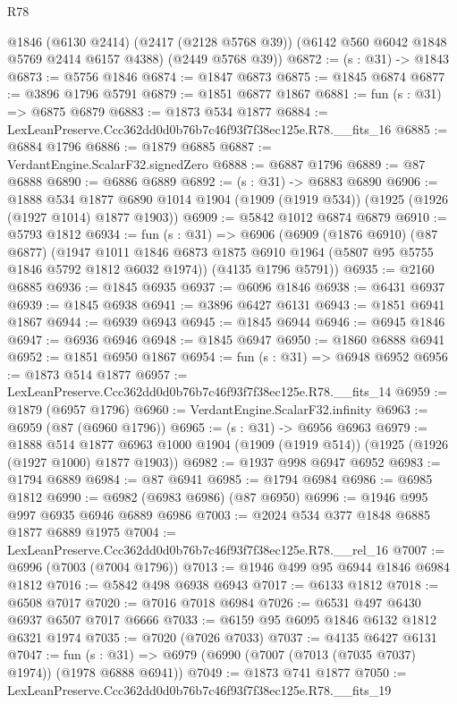 \begin{lexlean}{R78}
\begin{coremodule}
      @1846
      (@6130 @2414)
      (@2417 (@2128 @5768 @39))
      (@6142 @560 @6042 @1848 @5769 @2414 @6157 @4388)
      (@2449 @5768 @39))
@6872 := (s : @31) -> @1843
@6873 := @5756 @1846
@6874 := @1847 @6873
@6875 := @1845 @6874
@6877 := @3896 @1796 @5791
@6879 := @1851 @6877 @1867
@6881 := fun (s : @31) => @6875 @6879
@6883 := @1873 @534 @1877
@6884 := LexLeanPreserve.Ccc362dd0d0b76b7c46f93f7f38ec125e.R78.__fits_16
@6885 := @6884 @1796
@6886 := @1879 @6885
@6887 := VerdantEngine.ScalarF32.signedZero
@6888 := @6887 @1796
@6889 := @87 @6888
@6890 := @6886 @6889
@6892 := (s : @31) -> @6883 @6890
@6906 := @1888
    @534
    @1877
    @6890
    @1014
    @1904
    (@1909 (@1919 @534))
    (@1925 (@1926 (@1927 @1014) @1877 @1903))
@6909 := @5842 @1012 @6874 @6879
@6910 := @5793 @1812
@6934 := fun (s : @31) =>
  @6906
    (@6909
      (@1876 @6910)
      (@87 @6877)
      (@1947 @1011 @1846 @6873 @1875 @6910 @1964 (@5807 @95 @5755 @1846 @5792 @1812 @6032 @1974))
      (@4135 @1796 @5791))
@6935 := @2160 @6885
@6936 := @1845 @6935
@6937 := @6096 @1846
@6938 := @6431 @6937
@6939 := @1845 @6938
@6941 := @3896 @6427 @6131
@6943 := @1851 @6941 @1867
@6944 := @6939 @6943
@6945 := @1845 @6944
@6946 := @6945 @1846
@6947 := @6936 @6946
@6948 := @1845 @6947
@6950 := @1860 @6888 @6941
@6952 := @1851 @6950 @1867
@6954 := fun (s : @31) => @6948 @6952
@6956 := @1873 @514 @1877
@6957 := LexLeanPreserve.Ccc362dd0d0b76b7c46f93f7f38ec125e.R78.__fits_14
@6959 := @1879 (@6957 @1796)
@6960 := VerdantEngine.ScalarF32.infinity
@6963 := @6959 (@87 (@6960 @1796))
@6965 := (s : @31) -> @6956 @6963
@6979 := @1888
    @514
    @1877
    @6963
    @1000
    @1904
    (@1909 (@1919 @514))
    (@1925 (@1926 (@1927 @1000) @1877 @1903))
@6982 := @1937 @998 @6947 @6952
@6983 := @1794 @6889
@6984 := @87 @6941
@6985 := @1794 @6984
@6986 := @6985 @1812
@6990 := @6982 (@6983 @6986) (@87 @6950)
@6996 := @1946 @995 @997 @6935 @6946 @6889 @6986
@7003 := @2024 @534 @377 @1848 @6885 @1877 @6889 @1975
@7004 := LexLeanPreserve.Ccc362dd0d0b76b7c46f93f7f38ec125e.R78.__rel_16
@7007 := @6996 (@7003 (@7004 @1796))
@7013 := @1946 @499 @95 @6944 @1846 @6984 @1812
@7016 := @5842 @498 @6938 @6943
@7017 := @6133 @1812
@7018 := @6508 @7017
@7020 := @7016 @7018 @6984
@7026 := @6531 @497 @6430 @6937 @6507 @7017 @6666
@7033 := @6159 @95 @6095 @1846 @6132 @1812 @6321 @1974
@7035 := @7020 (@7026 @7033)
@7037 := @4135 @6427 @6131
@7047 := fun (s : @31) => @6979 (@6990 (@7007 (@7013 (@7035 @7037) @1974)) (@1978 @6888 @6941))
@7049 := @1873 @741 @1877
@7050 := LexLeanPreserve.Ccc362dd0d0b76b7c46f93f7f38ec125e.R78.__fits_19

\end{coremodule}
\end{lexlean}

